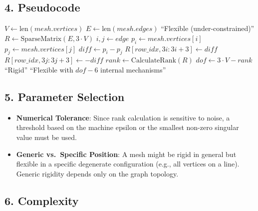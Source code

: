 \subsection{4. Pseudocode}

\begin{algorithm}
\caption{Analyze Mesh Rigidity}
\label{alg:analyze_mesh_rigidity}
\begin{algorithmic}[1]
    \State $V \gets \text{len}(mesh.\mathit{vertices})$
    \State $E \gets \text{len}(mesh.\mathit{edges})$
        \State \Return ``Flexible (under-constrained)''
    \EndIf
    \State $R \gets \text{SparseMatrix}(E, 3 \cdot V)$
        \State $i, j \gets \mathit{edge}$
        \State $p_i \gets mesh.\mathit{vertices}[i]$
        \State $p_j \gets mesh.\mathit{vertices}[j]$
        \State $\mathit{diff} \gets p_i - p_j$
        \State $R[\mathit{row\_idx}, 3i : 3i+3] \gets \mathit{diff}$
        \State $R[\mathit{row\_idx}, 3j : 3j+3] \gets -\mathit{diff}$
    \EndFor
    \State $\mathit{rank} \gets \text{CalculateRank}(R)$
    \State $\mathit{dof} \gets 3 \cdot V - \mathit{rank}$
        \State \Return ``Rigid''
    \Else
        \State \Return ``Flexible with $\mathit{dof} - 6$ internal mechanisms''
    \EndIf
\EndFunction
\end{algorithmic}
\end{algorithm}

\subsection{5. Parameter Selection}

\begin{itemize}
    \item \textbf{Numerical Tolerance}: Since rank calculation is sensitive to noise, a threshold based on the machine epsilon or the smallest non-zero singular value must be used.
    \item \textbf{Generic vs.\ Specific Position}: A mesh might be rigid in general but flexible in a specific degenerate configuration (e.g., all vertices on a line). Generic rigidity depends only on the graph topology.
\end{itemize}

\subsection{6. Complexity}

